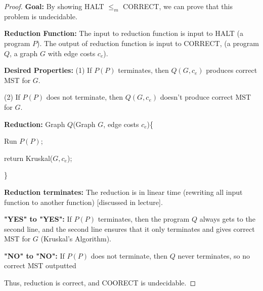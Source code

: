 \documentclass[openany]{article}
\begin{document}
\begin{proof}
    \textbf{Goal:} By showing HALT $\leqslant_m$ CORRECT, we can prove that this problem is undecidable. 

\textbf{Reduction Function:} The input to reduction function is input to HALT (a program $P$). The output of reduction function is input to CORRECT, (a program $Q$, a graph $G$ with edge costs $c_e$). 

\textbf{Desired Properties:}
(1) If $P(P)$ terminates, then $Q(G, c_e)$ produces correct MST for $G$.

(2) If $P(P)$ does not terminate, then $Q(G, c_e)$ doesn't produce correct MST for $G$.

\textbf{Reduction:}
Graph $Q$(Graph $G$, edge costs $c_e$)\{

\qquad Run $P(P)$;

\qquad return Kruskal($G, c_e$);

\}

\textbf{Reduction terminates:}
The reduction is in linear time (rewriting all input function to another function) [discussed in lecture].

\textbf{"YES" to "YES":} If $P(P)$ terminates, then the program $Q$ always gets to the
second line, and the second line ensures that it only
terminates and gives correct MST for $G$ (Kruskal's Algorithm).

\textbf{"NO" to "NO":} If $P(P)$ does not terminate, then $Q$ never terminates, so no correct MST outputted

Thus, reduction is correct, and COORECT is undecidable.


\end{proof}
\end{document}
